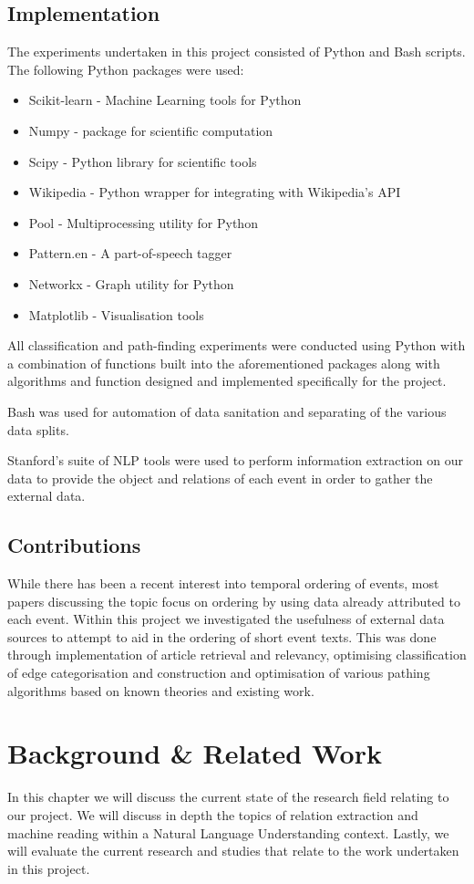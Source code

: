 \documentclass[bsc,frontabs,twoside,singlespacing,parskip,deptreport]{infthesis}     %
\begin{document}
\section{Implementation}
The experiments undertaken in this project consisted of Python and Bash scripts.
The following Python packages were used:
\begin{itemize}
\item Scikit-learn - Machine Learning tools for Python
\item Numpy - package for scientific computation
\item Scipy - Python library for scientific tools
\item Wikipedia - Python wrapper for integrating with Wikipedia's API
\item Pool - Multiprocessing utility for Python
\item Pattern.en - A part-of-speech tagger 
\item Networkx - Graph utility for Python
\item Matplotlib - Visualisation tools
\end{itemize}
All classification and path-finding experiments were conducted using Python with a combination of
functions built into the aforementioned packages along with algorithms and function designed and implemented
specifically for the project.

Bash was used for automation of data sanitation and separating of the various data splits. 

Stanford's suite of NLP tools were used to perform information extraction on our data to provide the
object and relations of each event in order to gather the external data.
\section{Contributions}
While there has been a recent interest into temporal ordering of events, most papers discussing the topic focus on
ordering by using data already attributed to each event. Within this project we investigated the usefulness of
external data sources to attempt to aid in the ordering of short event texts. This was done through implementation
of article retrieval and relevancy, optimising classification of edge categorisation and construction and optimisation
of various pathing algorithms based on known theories and existing work. 
\chapter{Background \& Related Work}
In this chapter we will discuss the current state of the research field relating to our project.
We will discuss in depth the topics of relation extraction and machine reading within a Natural Language Understanding
context. Lastly, we will evaluate the current research and studies that relate to the work undertaken in this project.
\end{document}
